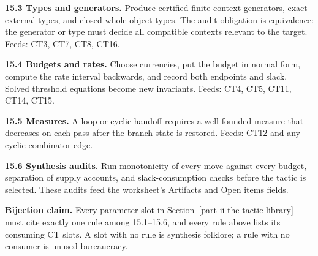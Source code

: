 \documentclass[
  11pt,
]{article}
\theoremstyle{definition}
\newcommand{\secref}[1]{\hyperref[#1]{Section~\ref*{#1}}}
\begin{document}
\textbf{15.3 Types and generators.} Produce certified finite context
generators, exact external types, and closed whole-object types. The
audit obligation is equivalence: the generator or type must decide all
compatible contexts relevant to the target. Feeds: CT3, CT7, CT8, CT16.

\textbf{15.4 Budgets and rates.} Choose currencies, put the budget in
normal form, compute the rate interval backwards, and record both
endpoints and slack. Solved threshold equations become new invariants.
Feeds: CT4, CT5, CT11, CT14, CT15.

\textbf{15.5 Measures.} A loop or cyclic handoff requires a
well-founded measure that decreases on each pass after the branch state
is restored. Feeds: CT12 and any cyclic combinator edge.

\textbf{15.6 Synthesis audits.} Run monotonicity of every move against
every budget, separation of supply accounts, and slack-consumption
checks before the tactic is selected. These audits feed the worksheet's
Artifacts and Open items fields.

\textbf{Bijection claim.} Every parameter slot in \secref{part-ii-the-tactic-library} must cite exactly
one rule among 15.1--15.6, and every rule above lists its consuming CT
slots. A slot with no rule is synthesis folklore; a rule with no
consumer is unused bureaucracy.
\end{document}
